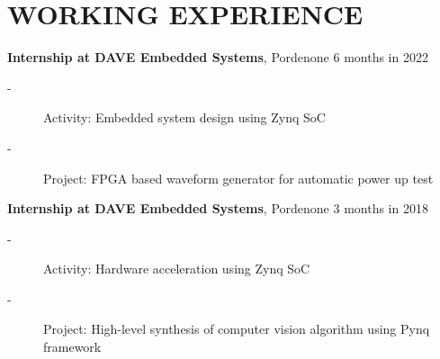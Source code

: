\section*{WORKING EXPERIENCE}
\begin{description}[leftmargin=5mm]
    \item \textbf{Internship at DAVE Embedded Systems}, Pordenone \hfill 6 months in 2022
    \begin{description}
        \item[-] Activity: Embedded system design using Zynq SoC
        \item[-] Project: FPGA based waveform generator for automatic power up test
    \end{description}
    \item \textbf{Internship at DAVE Embedded Systems}, Pordenone \hfill 3 months in 2018
    \begin{description}
        \item[-] Activity: Hardware acceleration using Zynq SoC
        \item[-] Project: High-level synthesis of computer vision algorithm using Pynq framework
    \end{description}
\end{description}
